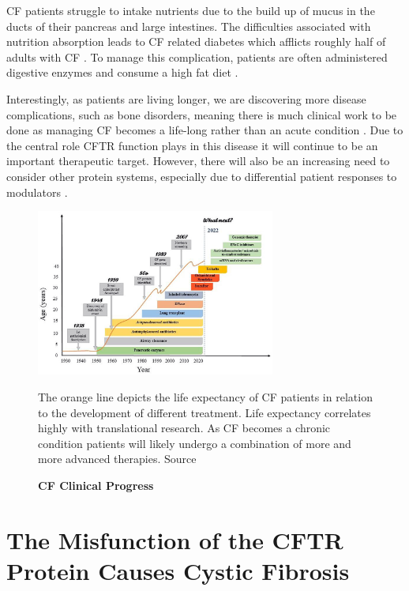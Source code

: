 CF patients struggle to intake nutrients due to the build up of mucus in the ducts of their pancreas and large intestines. The difficulties associated with nutrition absorption leads to CF related diabetes which afflicts roughly half of adults with CF \cite{Kayani2018}. To manage this complication, patients are often administered digestive enzymes and consume a high fat diet \cite{sullivan2017}. 

Interestingly, as patients are living longer, we are discovering more disease complications, such as bone disorders, meaning there is much clinical work to be done as managing CF becomes a life-long rather than an acute condition \cite{stalvey2013}. Due to the central role CFTR function plays in this disease it will continue to be an important therapeutic target. However, there will also be an increasing need to consider other protein systems, especially due to differential patient responses to modulators \cite{hanafin2021, robertson2015, lingam2017, seelig2020, barbieri2021a, grebert2019}. 

\begin{figure}
	\label{CF_life_expectancy}
	\begin{center}
	\includegraphics[width=0.7\textwidth]{figures/CF_life_expectancy.png}
	\end{center}
	\captionsetup{singlelinecheck = false, justification=raggedright}
	\caption[CF Clinical Progress] {\textbf{CF Clinical Progress}}{The orange line depicts the life expectancy of CF patients in relation to the development of different treatment.  Life expectancy correlates highly with translational research. As CF becomes a chronic condition patients will likely undergo a combination of more and more advanced therapies. Source \cite{garcia2022}} 
\end{figure}


\section{The Misfunction of the CFTR Protein Causes Cystic Fibrosis}

